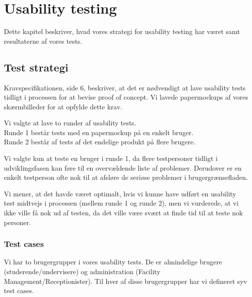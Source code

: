 \chapter{Usability testing}
\label{Usability}
Dette kapitel beskriver, hvad vores strategi for usability testing har været samt resultaterne af vores tests.

\section{Test strategi}
\label{Usability_TS}
Kravspecifikationen, side 6, beskriver, at det er nødvendigt at lave usability tests tidligt i processen for at bevise proof of concept. Vi lavede papermockups af vores skærmbilleder for at opfylde dette krav. 

Vi valgte at lave to runder af usability tests.
\\Runde 1 består tests med en papermockup på en enkelt bruger.
\\Runde 2 består af tests af det endelige produkt på flere brugere.

Vi valgte kun at teste en bruger i runde 1, da flere testpersoner tidligt i udviklingsfasen kan føre til en overvældende liste af problemer\cite[s. 416]{SL_UID}. Derudover er en enkelt testperson ofte nok til at afsløre de seriøse problemer i brugergrænsefladen.

Vi mener, at det havde været optimalt, hvis vi kunne have udført en usability test midtvejs i processen (mellem runde 1 og runde 2), men vi vurderede, at vi ikke ville få nok ud af testen, da det ville være svært at finde tid til at teste nok personer.

\subsection{Test cases}
\label{Usability_TS_TC}
Vi har to brugergrupper i vores usability tests. De er almindelige brugere (studerende/undervisere) og administration (Facility Management/Receptionister). Til hver af disse brugergrupper har vi defineret syv test cases.

